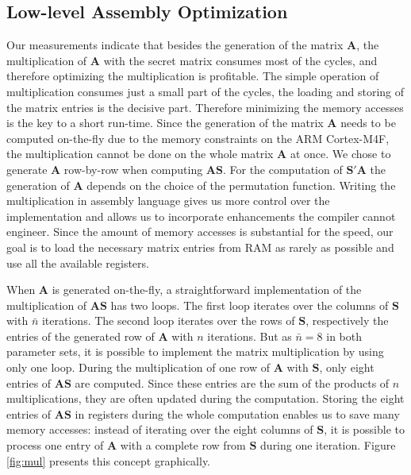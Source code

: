 \subsection{Low-level Assembly Optimization}

Our measurements indicate that besides the generation of the matrix $\mathbf{A}$, the multiplication of $\mathbf{A}$ with the secret matrix consumes most of the cycles, and therefore optimizing the multiplication is profitable. The simple operation of multiplication consumes just a small part of the cycles, the loading and storing of the matrix entries is the decisive part. Therefore minimizing the memory accesses is the key to a short run-time. Since the generation of the matrix $\mathbf{A}$ needs to be computed on-the-fly due to the memory constraints on the ARM Cortex-M4F, the multiplication cannot be done on the whole matrix $\mathbf{A}$ at once. We chose to generate $\mathbf{A}$ row-by-row when computing $\mathbf{AS}$. For the computation of $\mathbf{S'A}$ the generation of $\mathbf{A}$ depends on the choice of the permutation function. Writing the multiplication in assembly language gives us more control over the implementation and allows us to incorporate enhancements the compiler cannot engineer. Since the amount of memory accesses is substantial for the speed, our goal is to load the necessary matrix entries from RAM as rarely as possible and use all the available registers.

When $\mathbf{A}$ is generated on-the-fly, a straightforward implementation of the multiplication of $\mathbf{AS}$ has two loops. The first loop iterates over the columns of $\mathbf{S}$ with $\bar{n}$ iterations. The second loop iterates over the rows of $\mathbf{S}$, respectively the entries of the generated row of $\mathbf{A}$ with $n$ iterations.  But as $\bar{n} = 8$ in both parameter sets, it is possible to implement the matrix multiplication by using only one loop. During the multiplication of one row of $\mathbf{A}$ with $\mathbf{S}$, only eight entries of $\mathbf{AS}$ are computed. Since these entries are the sum of the products of $n$ multiplications, they are often updated during the computation. Storing the eight entries of $\mathbf{AS}$ in registers during the whole computation enables us to save many memory accesses: instead of iterating over the eight columns of $\mathbf{S}$, it is possible to process one entry of $\mathbf{A}$ with a complete row from $\mathbf{S}$ during one iteration. Figure \ref{fig:mul} presents this concept graphically.

